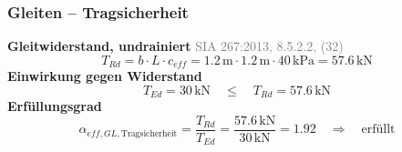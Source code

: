 \documentclass[11pt,a4paper]{article}
\newcommand{\normref}[1]{{\small\textcolor{gray}{#1}}}
\begin{document}
\subsubsection{Gleiten – Tragsicherheit}
\noindent\textbf{Gleitwiderstand, undrainiert} \hfill \normref{SIA 267:2013, 8.5.2.2, (32)}
\begin{equation*}
T_{Rd} = b \cdot L \cdot c_{eff} = 1.2\,\mathrm{m} \cdot 1.2\,\mathrm{m} \cdot 40\,\mathrm{kPa} = 57.6\,\mathrm{kN}
\end{equation*}
\noindent\textbf{Einwirkung gegen Widerstand}
\begin{equation*}
T_{Ed} = 30\,\mathrm{kN} \quad \le \quad T_{Rd} = 57.6\,\mathrm{kN}
\end{equation*}
\noindent\textbf{Erfüllungsgrad}
\begin{equation*}
\alpha_{eff,GL,\text{Tragsicherheit}} = \frac{T_{Rd}}{T_{Ed}} = \frac{57.6\,\mathrm{kN}}{30\,\mathrm{kN}} = 1.92 \quad \Rightarrow \quad \text{erfüllt}
\end{equation*}
\end{document}
